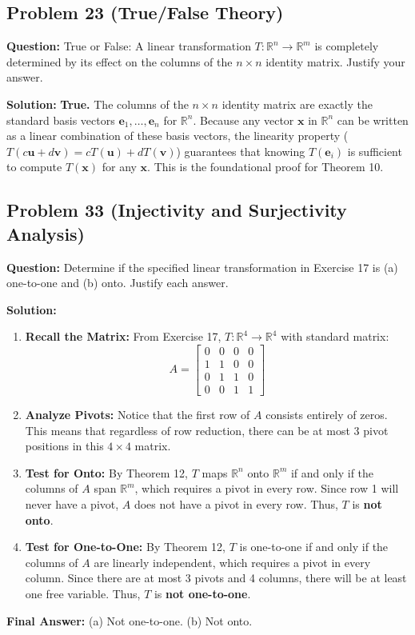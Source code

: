 \documentclass[11pt]{article}
\begin{document}
\subsection*{Problem 23 (True/False Theory)}
\textbf{Question:} True or False: A linear transformation $T: \mathbb{R}^n \to \mathbb{R}^m$ is completely determined by its effect on the columns of the $n \times n$ identity matrix. Justify your answer.

\textbf{Solution:}
\textbf{True.} The columns of the $n \times n$ identity matrix are exactly the standard basis vectors $\mathbf{e}_1, \dots, \mathbf{e}_n$ for $\mathbb{R}^n$. Because any vector $\mathbf{x}$ in $\mathbb{R}^n$ can be written as a linear combination of these basis vectors, the linearity property ($T(c\mathbf{u}+d\mathbf{v}) = cT(\mathbf{u})+dT(\mathbf{v})$) guarantees that knowing $T(\mathbf{e}_i)$ is sufficient to compute $T(\mathbf{x})$ for any $\mathbf{x}$. This is the foundational proof for Theorem 10.

\subsection*{Problem 33 (Injectivity and Surjectivity Analysis)}
\textbf{Question:} Determine if the specified linear transformation in Exercise 17 is (a) one-to-one and (b) onto. Justify each answer.

\textbf{Solution:}
\begin{enumerate}
    \item \textbf{Recall the Matrix:} From Exercise 17, $T: \mathbb{R}^4 \to \mathbb{R}^4$ with standard matrix:
    \[ A = \begin{bmatrix} 0 & 0 & 0 & 0 \\ 1 & 1 & 0 & 0 \\ 0 & 1 & 1 & 0 \\ 0 & 0 & 1 & 1 \end{bmatrix} \]
    \item \textbf{Analyze Pivots:} Notice that the first row of $A$ consists entirely of zeros. This means that regardless of row reduction, there can be at most 3 pivot positions in this $4 \times 4$ matrix. 
    \item \textbf{Test for Onto:} By Theorem 12, $T$ maps $\mathbb{R}^n$ onto $\mathbb{R}^m$ if and only if the columns of $A$ span $\mathbb{R}^m$, which requires a pivot in every row. Since row 1 will never have a pivot, $A$ does not have a pivot in every row. Thus, $T$ is \textbf{not onto}.
    \item \textbf{Test for One-to-One:} By Theorem 12, $T$ is one-to-one if and only if the columns of $A$ are linearly independent, which requires a pivot in every column. Since there are at most 3 pivots and 4 columns, there will be at least one free variable. Thus, $T$ is \textbf{not one-to-one}.
\end{enumerate}
\textbf{Final Answer:} (a) Not one-to-one. (b) Not onto.
\end{document}
